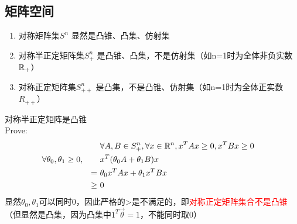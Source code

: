 \documentclass{mytemplate}
\begin{document}
\subsection{矩阵空间}
\begin{proposition}
    \hspace*{1em}
    \begin{enumerate}
        \item 对称矩阵集$S^n$ \qquad\qquad\quad 显然是凸锥、凸集、仿射集
        \item 对称半正定矩阵集$S_+^n$ \qquad 是凸锥、凸集，不是仿射集（如n=1时为全体非负实数$\mathbb{R}_+$）
        \item 对称正定矩阵集$S_{++}^n$ \qquad 是凸集，不是凸锥、仿射集（如n=1时为全体正实数$R_{++}$）
    \end{enumerate}
\end{proposition}
对称半正定矩阵是凸锥\\
Prove:
\begin{align}
     &                                   &        & \forall A,B \in S_+^n, \forall  x\in \mathbb{R}^n, x^T A x \geq 0, x^T B x \geq 0 &  & \\
     & \forall \theta_0,\theta_1 \geq 0, &        & x^T(\theta_0 A+\theta_1B)x                                                &  & \\
     &                                   & =\     & \theta_0x^T A x+\theta_1x^T B x                                           &  & \\
     &                                   & \geq\  & 0                                                                         &  &
\end{align}
显然$\theta_0, \theta_1$可以同时0，因此严格的>是不满足的，即\textcolor{red}{对称正定矩阵集合不是凸锥}\\
（但显然是凸集，因为凸集中$1^T\vec{\theta} = 1$，不能同时取0）
                                                                                
\end{document}
